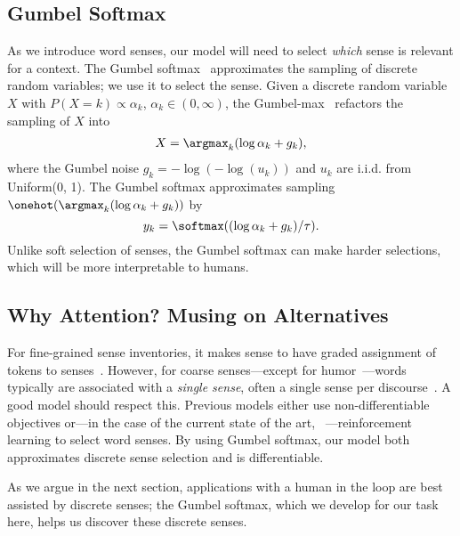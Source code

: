 \subsection{Gumbel Softmax}
\label{sec:gs}

As we introduce word senses, our model will need to select
\emph{which} sense is relevant for a context.  The Gumbel
softmax~\citep{jang2016categorical,maddison2016concrete} approximates
the sampling of discrete random variables; we use it to select the
sense.  Given a discrete random variable $X$ with
$P(X=k) \propto \alpha_k$, $\alpha_k \in (0, \infty)$, the
Gumbel-max~\citep{gumbel1954statistical}
refactors the sampling of $X$ into
\begin{eqnarray}
X = \argmax_k (\log \alpha_k + g_k),
\end{eqnarray}
where the Gumbel noise $g_k = -\log(-\log(u_k))$ and $u_k$ are i.i.d.
 from Uniform(0, 1).
The Gumbel softmax approximates sampling $
\onehot(\argmax_k (\log \alpha_k + g_k))$ by
 \begin{equation}
y_k = \softmax((\log \alpha_k  + g_k)/\tau).
 \end{equation}
Unlike soft selection of senses, the Gumbel softmax can make harder
selections, which will be more interpretable to humans.







\subsection{Why Attention?  Musing on Alternatives}
\label{sec:attention-muse}

For fine-grained sense inventories, it makes sense to have graded
assignment of tokens to senses~\cite{erk-09,jurgens-15}.  However, for
coarse senses---except for humor~\cite{miller-17}---words
typically are associated with a \emph{single sense}, often a single
sense per discourse~\cite{gale-92}.  A good model should respect this.
Previous models either use non-differentiable objectives or---in the
case of the current state of the art,
\muse{}~\cite{Muse}---reinforcement learning to select word senses.
By using Gumbel softmax, our model both approximates discrete sense
selection and is differentiable.

As we argue in the next section, applications with a human in the loop
are best assisted by discrete senses; the Gumbel softmax, which we
develop for our task here, helps us discover these discrete senses.

